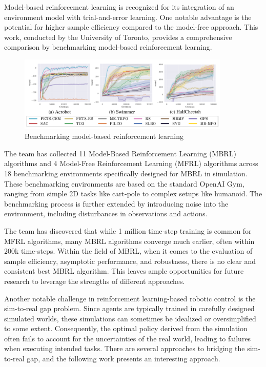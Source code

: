 Model-based reinforcement learning is recognized for its integration of an environment model with trial-and-error learning. One notable advantage is the potential for higher sample efficiency compared to the model-free approach. This work, conducted by the University of Toronto\cite{wang2019benchmarking}, provides a comprehensive comparison by benchmarking model-based reinforcement learning.

\begin{figure}[H]
  \centering
  \includegraphics[width=0.9\textwidth]{figures/benchmarking_mbrl.png} %
  \caption{Benchmarking model-based reinforcement learning\cite{wang2019benchmarking}}
  \label{fig:benchmarking MBRL}
\end{figure}

The team has collected 11 Model-Based Reinforcement Learning (MBRL) algorithms and 4 Model-Free Reinforcement Learning (MFRL) algorithms across 18 benchmarking environments specifically designed for MBRL in simulation. These benchmarking environments are based on the standard OpenAI Gym\cite{brockman2016openai}, ranging from simple 2D tasks like cart-pole to complex setups like humanoid. The benchmarking process is further extended by introducing noise into the environment, including disturbances in observations and actions.

The team has discovered that while 1 million time-step training is common for MFRL algorithms, many MBRL algorithms converge much earlier, often within 200k time-steps. Within the field of MBRL, when it comes to the evaluation of sample efficiency, asymptotic performance, and robustness, there is no clear and consistent best MBRL algorithm. This leaves ample opportunities for future research to leverage the strengths of different approaches.

Another notable challenge in reinforcement learning-based robotic control is the sim-to-real gap problem. Since agents are typically trained in carefully designed simulated worlds, these simulations can sometimes be idealized or oversimplified to some extent. Consequently, the optimal policy derived from the simulation often fails to account for the uncertainties of the real world, leading to failures when executing intended tasks. There are several approaches to bridging the sim-to-real gap, and the following work presents an interesting approach.

